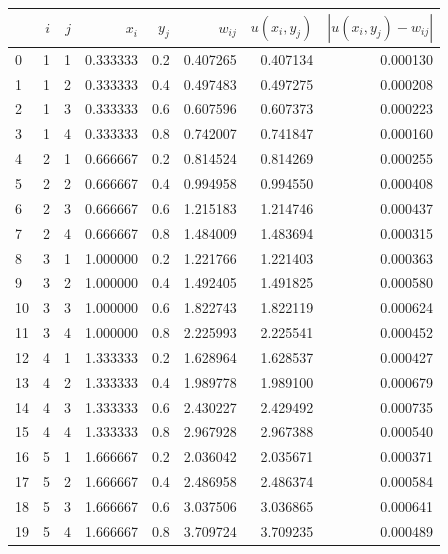 \documentclass[a4paper]{article}
\begin{document}
\begin{tabular}{lrrrrrrr}
\toprule
{} &  $i$ &  $j$ &       $x_i$ &  $y_j$ &      $w_{ij}$ &  $u(x_i,y_j)$ &  $|u(x_i,y_j)-w_{ij}|$ \\
\midrule
0  &  1 &  1 &  0.333333 &  0.2 &  0.407265 &    0.407134 &           0.000130 \\
1  &  1 &  2 &  0.333333 &  0.4 &  0.497483 &    0.497275 &           0.000208 \\
2  &  1 &  3 &  0.333333 &  0.6 &  0.607596 &    0.607373 &           0.000223 \\
3  &  1 &  4 &  0.333333 &  0.8 &  0.742007 &    0.741847 &           0.000160 \\
4  &  2 &  1 &  0.666667 &  0.2 &  0.814524 &    0.814269 &           0.000255 \\
5  &  2 &  2 &  0.666667 &  0.4 &  0.994958 &    0.994550 &           0.000408 \\
6  &  2 &  3 &  0.666667 &  0.6 &  1.215183 &    1.214746 &           0.000437 \\
7  &  2 &  4 &  0.666667 &  0.8 &  1.484009 &    1.483694 &           0.000315 \\
8  &  3 &  1 &  1.000000 &  0.2 &  1.221766 &    1.221403 &           0.000363 \\
9  &  3 &  2 &  1.000000 &  0.4 &  1.492405 &    1.491825 &           0.000580 \\
10 &  3 &  3 &  1.000000 &  0.6 &  1.822743 &    1.822119 &           0.000624 \\
11 &  3 &  4 &  1.000000 &  0.8 &  2.225993 &    2.225541 &           0.000452 \\
12 &  4 &  1 &  1.333333 &  0.2 &  1.628964 &    1.628537 &           0.000427 \\
13 &  4 &  2 &  1.333333 &  0.4 &  1.989778 &    1.989100 &           0.000679 \\
14 &  4 &  3 &  1.333333 &  0.6 &  2.430227 &    2.429492 &           0.000735 \\
15 &  4 &  4 &  1.333333 &  0.8 &  2.967928 &    2.967388 &           0.000540 \\
16 &  5 &  1 &  1.666667 &  0.2 &  2.036042 &    2.035671 &           0.000371 \\
17 &  5 &  2 &  1.666667 &  0.4 &  2.486958 &    2.486374 &           0.000584 \\
18 &  5 &  3 &  1.666667 &  0.6 &  3.037506 &    3.036865 &           0.000641 \\
19 &  5 &  4 &  1.666667 &  0.8 &  3.709724 &    3.709235 &           0.000489 \\
\bottomrule
\end{tabular}
\end{document}
